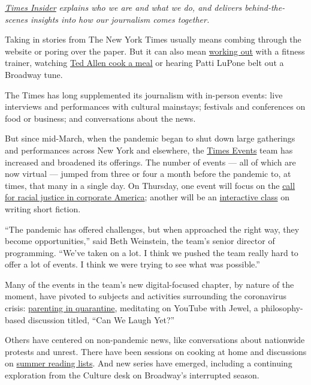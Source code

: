 \href{https://www.nytimes.com/series/times-insider}{\emph{Times
Insider}} \emph{explains who we are and what we do, and delivers
behind-the-scenes insights into how our journalism comes together.}

Taking in stories from The New York Times usually means combing through
the website or poring over the paper. But it can also mean
\href{https://timesevents.nytimes.com/thejoyofgymlessworkouts}{working
out} with a fitness trainer, watching
\href{https://timesevents.nytimes.com/kidscooking}{Ted Allen cook a
meal} or hearing Patti LuPone belt out a Broadway tune.

The Times has long supplemented its journalism with in-person events:
live interviews and performances with cultural mainstays; festivals and
conferences on food or business; and conversations about the news.

But since mid-March, when the pandemic began to shut down large
gatherings and performances across New York and elsewhere, the
\href{https://timesevents.nytimes.com/}{Times Events} team has increased
and broadened its offerings. The number of events --- all of which are
now virtual --- jumped from three or four a month before the pandemic
to, at times, that many in a single day. On Thursday, one event will
focus on the
\href{https://timesevents.nytimes.com/dealbookdebrief0806}{call for
racial justice in corporate America}; another will be an
\href{https://timesevents.nytimes.com/astorywritingclasswithcurtissittenfeld}{interactive
class} on writing short fiction.

``The pandemic has offered challenges, but when approached the right
way, they become opportunities,'' said Beth Weinstein, the team's senior
director of programming. ``We've taken on a lot. I think we pushed the
team really hard to offer a lot of events. I think we were trying to see
what was possible.''

Many of the events in the team's new digital-focused chapter, by nature
of the moment, have pivoted to subjects and activities surrounding the
coronavirus crisis:
\href{https://timesevents.nytimes.com/parenting}{parenting in
quarantine}, meditating on YouTube with Jewel, a philosophy-based
discussion titled, ``Can We Laugh Yet?''

Others have centered on non-pandemic news, like conversations about
nationwide protests and unrest. There have been sessions on cooking at
home and discussions on
\href{https://timesevents.nytimes.com/bookreviewlive}{summer reading
lists}. And new series have emerged, including a continuing exploration
from the Culture desk on Broadway's interrupted season.

